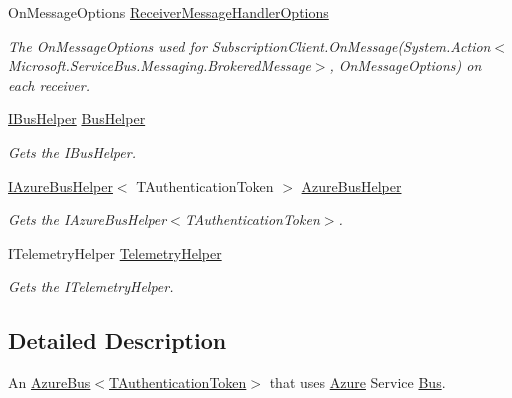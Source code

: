 \begin{DoxyCompactItemize}
On\+Message\+Options \hyperlink{classCqrs_1_1Azure_1_1ServiceBus_1_1AzureServiceBus_abe75d8be8b9ffbc5a37164467963babd_abe75d8be8b9ffbc5a37164467963babd}{Receiver\+Message\+Handler\+Options}
\begin{DoxyCompactList}\small\item\em The On\+Message\+Options used for Subscription\+Client.\+On\+Message(\+System.\+Action$<$\+Microsoft.\+Service\+Bus.\+Messaging.\+Brokered\+Message$>$, On\+Message\+Options) on each receiver. \end{DoxyCompactList}\item 
\hyperlink{interfaceCqrs_1_1Bus_1_1IBusHelper}{I\+Bus\+Helper} \hyperlink{classCqrs_1_1Azure_1_1ServiceBus_1_1AzureServiceBus_aba45a2bece8e265b9f06695b1e90a2a1_aba45a2bece8e265b9f06695b1e90a2a1}{Bus\+Helper}
\begin{DoxyCompactList}\small\item\em Gets the I\+Bus\+Helper. \end{DoxyCompactList}\item 
\hyperlink{interfaceCqrs_1_1Azure_1_1ServiceBus_1_1IAzureBusHelper}{I\+Azure\+Bus\+Helper}$<$ T\+Authentication\+Token $>$ \hyperlink{classCqrs_1_1Azure_1_1ServiceBus_1_1AzureServiceBus_a7c537c53265bf01d550982c04579493e_a7c537c53265bf01d550982c04579493e}{Azure\+Bus\+Helper}
\begin{DoxyCompactList}\small\item\em Gets the I\+Azure\+Bus\+Helper$<$\+T\+Authentication\+Token$>$. \end{DoxyCompactList}\item 
I\+Telemetry\+Helper \hyperlink{classCqrs_1_1Azure_1_1ServiceBus_1_1AzureServiceBus_af5f6d62cbdb3ad711ea42505491ffca3_af5f6d62cbdb3ad711ea42505491ffca3}{Telemetry\+Helper}
\begin{DoxyCompactList}\small\item\em Gets the I\+Telemetry\+Helper. \end{DoxyCompactList}\end{DoxyCompactItemize}


\subsection{Detailed Description}
An \hyperlink{classCqrs_1_1Azure_1_1ServiceBus_1_1AzureBus_a1046ff74282fd178f43e28420433d2a9_a1046ff74282fd178f43e28420433d2a9}{Azure\+Bus$<$\+T\+Authentication\+Token$>$} that uses \hyperlink{namespaceCqrs_1_1Azure}{Azure} Service \hyperlink{namespaceCqrs_1_1Bus}{Bus}. 


